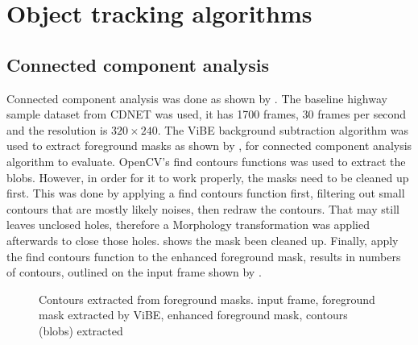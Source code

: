 \section{Object tracking algorithms}



\subsection{Connected component analysis}

Connected component analysis was done as shown by . The baseline highway sample dataset from CDNET \cite{goyette2012changedetection} was used, it has 1700 frames, 30 frames per second and the resolution is $320 \times 240$. The ViBE background subtraction algorithm was used to extract foreground masks as shown by , for connected component analysis algorithm to evaluate. OpenCV's find contours functions was used to extract the blobs. However, in order for it to work properly, the masks need to be cleaned up first. This was done by applying a find contours function first, filtering out small contours that are mostly likely noises, then redraw the contours. That may still leaves unclosed holes, therefore a Morphology transformation \cite{serra1982image} was applied afterwards to close those holes.  shows the mask been cleaned up. Finally, apply the find contours function to the enhanced foreground mask, results in numbers of contours, outlined on the input frame shown by .

\begin{figure}[htb]
  \centering
  \caption{Contours extracted from foreground masks.  input frame,  foreground mask extracted by ViBE,  enhanced foreground mask,  contours (blobs) extracted}
  \label{imp:cca}
\end{figure}

